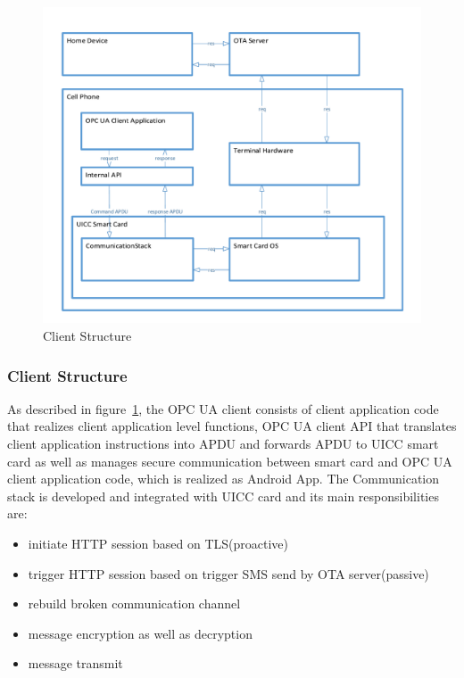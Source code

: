 \documentclass[]{llncs}
\begin{document}
 \begin{figure}
	\centering
	\includegraphics[width=1.2\textwidth]{clientStructure}
		\caption[ ]{Client Structure}
	\label{fig:clientStructure}
\end{figure}
\subsubsection{Client Structure}
As described in figure~\ref{fig:clientStructure}, the OPC UA client consists of client application code that realizes client application level functions, OPC UA client API that translates client application instructions into APDU and forwards APDU to UICC smart card as well as  manages secure communication between smart card and OPC UA client application code, which is realized as Android  App. The Communication stack is developed and integrated with UICC card and its main responsibilities are:
\begin{itemize}
  \item initiate HTTP session based on TLS(proactive)
  \item trigger HTTP session based on trigger SMS send by OTA server(passive)
  \item rebuild broken communication channel
  \item message encryption as well as decryption
  \item message transmit
\end{itemize}
\end{document}
